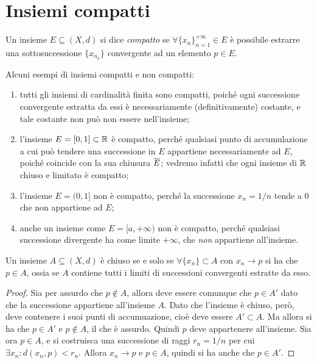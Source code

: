\section{Insiemi compatti}
\begin{definizione}
Un insieme $E\subseteq(X,d)$ si dice \emph{compatto} se $\forall\{x_n\}_{n=1}^{+\infty}\in E$ è possibile estrarre una sottosuccessione $\{x_{n_k}\}$ convergente ad un elemento $p\in E$.
\end{definizione}
\begin{esempio} \label{es:compatti}
	Alcuni esempi di insiemi compatti e non compatti:
	\begin{enumerate}
		\item tutti gli insiemi di cardinalità finita sono compatti, poich\'e ogni successione convergente estratta da essi è necessariamente (definitivamente) costante, e tale costante non può non essere nell'insieme;
		\item l'insieme $E=[0,1]\subset\mathbb{R}$ è compatto, perché qualsiasi punto di accumulazione a cui può tendere una successione in $E$ appartiene necessariamente ad $E$, poiché coincide con la sua chiusura $\overline{E}$; vedremo infatti che ogni insieme di $\mathbb{R}$ chiuso e limitato è compatto;
		\item l'insieme $E=(0,1]$ non è compatto, perché la successione $x_n=1/n$ tende a 0 che non appartiene ad $E$;
		\item anche un insieme come $E=[a,+\infty)$ non è compatto, perché qualsiasi successione divergente ha come limite $+\infty$, che \emph{non} appartiene all'insieme.
	\end{enumerate}
\end{esempio}
\begin{lemma}
Un insieme $A\subseteq(X,d)$ è chiuso se e solo se $\forall\{x_n\}\subset A$ con $x_n\to p$ si ha che $p\in A$, ossia se $A$ contiene tutti i limiti di successioni convergenti estratte da esso.
\end{lemma}
\begin{proof}
Sia per assurdo che $p\notin A$, allora deve essere comunque che $p\in A'$ dato che la successione appartiene all'insieme $A$. Dato che l'insieme è chiuso, però, deve contenere i suoi punti di accumuazione, cioè deve essere $A'\subset A$. Ma allora si ha che $p\in A'$ e $p\notin A$, il che è assurdo. Quindi $p$ deve appartenere all'insieme.
Sia ora $p\in A$, e si costruisca una successione di raggi $r_n=1/n$ per cui $\exists x_n\colon d(x_n,p)<r_n$. Allora $x_n\to p$ e $p\in A$, quindi si ha anche che $p\in A'$.
\end{proof}

